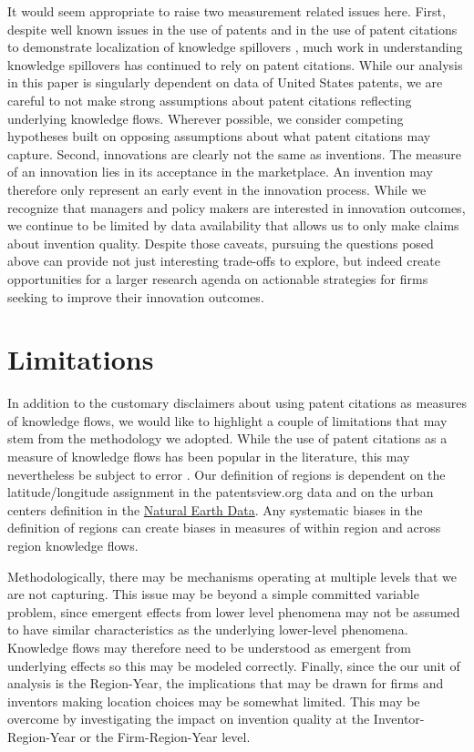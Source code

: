 \documentclass[12pt,letterpaper]{article}
\begin{document}
It would seem appropriate to raise two measurement related issues here. First, despite well known issues in the use of patents \citep{Griliches1990, Scherer1984} and in the use of patent citations to demonstrate localization of knowledge spillovers \citep*{Thompson2005, Arora2017a}, much work in understanding knowledge spillovers has continued to rely on patent citations. While our analysis in this paper is singularly dependent on data of United States patents, we are careful to not make strong assumptions about patent citations reflecting underlying knowledge flows. Wherever possible, we consider competing hypotheses built on opposing assumptions about what patent citations may capture. Second, innovations are clearly not the same as inventions. The measure of an innovation lies in its acceptance in the marketplace. An invention may therefore only represent an early event in the innovation process. While we recognize that managers and policy makers are interested in innovation outcomes, we continue to be limited by data availability that allows us to only make claims about invention quality. Despite those caveats, pursuing the questions posed above can provide not just interesting trade-offs to explore, but indeed create opportunities for a larger research agenda on actionable strategies for firms seeking to improve their innovation outcomes.\par


\section*{Limitations}
In addition to the customary disclaimers about using patent citations as measures of knowledge flows, we would like to highlight a couple of limitations that may stem from the methodology we adopted. While the use of patent citations as a measure of knowledge flows has been popular in the literature, this may nevertheless be subject to error \citep*{Arora2017a}. Our definition of regions is dependent on the latitude/longitude assignment in the patentsview.org data and on the urban centers definition in the \href{http://www.naturalearthdata.com/downloads/10m-cultural-vectors/}{Natural Earth Data}. Any systematic biases in the definition of regions can create biases in measures of within region and across region knowledge flows. \par

Methodologically, there may be mechanisms operating at multiple levels that we are not capturing. This issue may be beyond a simple committed variable problem, since emergent effects from lower level phenomena may not be assumed to have similar characteristics as the underlying lower-level phenomena. Knowledge flows may therefore need to be understood as emergent from underlying effects so this may be modeled correctly. Finally, since the our unit of analysis is the Region-Year, the implications that may be drawn for firms and inventors making location choices may be somewhat limited. This may be overcome by investigating the impact on invention quality at the Inventor-Region-Year or the Firm-Region-Year level. 
\end{document}
